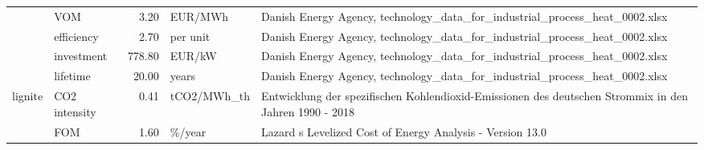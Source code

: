 \begin{longtable}{p{5cm}p{3cm}rp{3cm}p{11cm}}
                      & VOM &           3.20 &                           EUR/MWh &                                                                                                                                                                                                                                                          Danish Energy Agency, technology\_data\_for\_industrial\_process\_heat\_0002.xlsx \\
                      & efficiency &           2.70 &                          per unit &                                                                                                                                                                                                                                                          Danish Energy Agency, technology\_data\_for\_industrial\_process\_heat\_0002.xlsx \\
                      & investment &         778.80 &                            EUR/kW &                                                                                                                                                                                                                                                          Danish Energy Agency, technology\_data\_for\_industrial\_process\_heat\_0002.xlsx \\
                      & lifetime &          20.00 &                             years &                                                                                                                                                                                                                                                          Danish Energy Agency, technology\_data\_for\_industrial\_process\_heat\_0002.xlsx \\
lignite & CO2 intensity &           0.41 &                       tCO2/MWh\_th &                                                                                                                                                                                                                                Entwicklung der spezifischen Kohlendioxid-Emissionen des deutschen Strommix in den Jahren 1990 - 2018 \\
                      & FOM &           1.60 &                            \%/year &                                                                                                                                                                                                                                                                            Lazard s Levelized Cost of Energy Analysis - Version 13.0 \\

\end{longtable}
